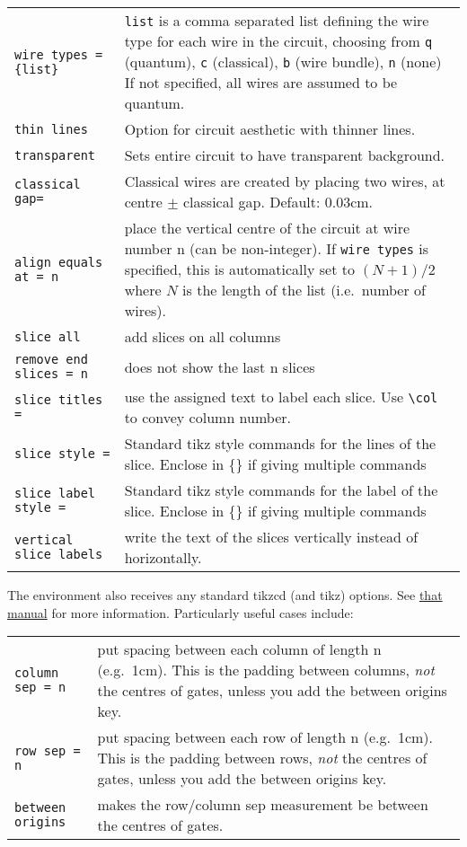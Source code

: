 \documentclass[aps,pra,10pt,nofootinbib]{revtex4-2}
\begin{document}
\begin{description}[style=nextline]
\begin{tabular}{p{4cm}p{10cm}}
\texttt{wire types = \{list\}} & \texttt{list} is a comma separated list defining the wire type for each wire in the circuit, choosing from \texttt{q} (quantum), \texttt{c} (classical), \texttt{b} (wire bundle), \texttt{n} (none) If not specified, all wires are assumed to be quantum.\\
\texttt{thin lines} & Option for circuit aesthetic with thinner lines. \\
\texttt{transparent} & Sets entire circuit to have transparent background. \\
\texttt{classical gap=} & Classical wires are created by placing two wires, at centre $\pm$ classical gap. Default: 0.03cm. \\
\texttt{align equals at = n} & place the vertical centre of the circuit at wire number n (can be non-integer). If \verb!wire types! is specified, this is automatically set to $(N+1)/2$ where $N$ is the length of the list (i.e.\ number of wires).\\
\texttt{slice all} & add slices on all columns\\
\texttt{remove end slices = n} & does not show the last n slices\\
\texttt{slice titles =} & use the assigned text to label each slice. Use \verb!\col! to convey column number. \\
\texttt{slice style =}& Standard tikz style commands for the lines of the slice. Enclose in \{\} if giving multiple commands\\
\texttt{slice label style =} & Standard tikz style commands for the label of the slice. Enclose in \{\} if giving multiple commands\\
\texttt{vertical slice labels} & write the text of the slices vertically instead of horizontally. \\
\end{tabular}

The environment also receives any standard tikzcd (and tikz) options. See \href{http://mirrors.ctan.org/graphics/pgf/contrib/tikz-cd/tikz-cd-doc.pdf}{that manual} for more information. Particularly useful cases include:

\begin{tabular}{p{4cm}p{10cm}}
\texttt{column sep = n} & put spacing between each column of length n (e.g.\ 1cm). This is the padding between columns, \emph{not} the centres of gates, unless you add the between origins key.\\
\texttt{row sep = n} & put spacing between each row of length n (e.g.\ 1cm). This is the padding between rows, \emph{not} the centres of gates, unless you add the between origins key.\\
\texttt{between origins} & makes the row/column sep measurement be between the centres of gates.
\end{tabular}


\end{description}
\end{document}
